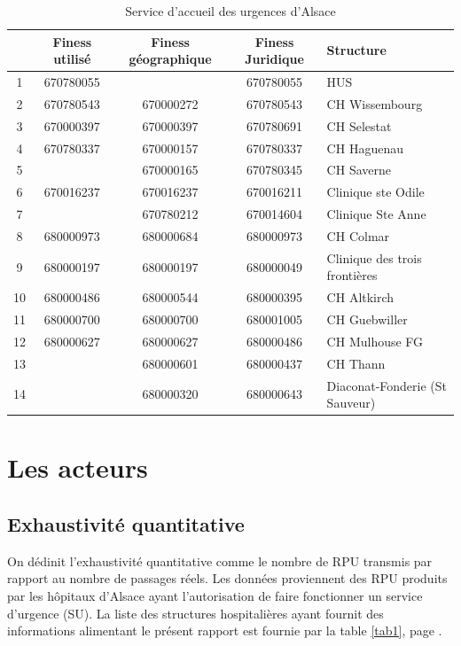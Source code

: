 \documentclass[12pt,english,french,twoside]{report}\usepackage[]{graphicx}\usepackage[]{color}
\begin{document}
\begin{table}
\begin{center}
\begin{tabular}{|c|c|c|c|l|}
  \hline
& Finess utilisé & Finess géographique & Finess Juridique & Structure \\
  \hline
  \hline
1 & 670780055 &   & 670780055 & HUS \\
2 & 670780543 & 670000272 & 670780543 & CH Wissembourg \\
3 & 670000397 & 670000397  & 670780691 & CH Selestat \\
4 & 670780337 & 670000157 & 670780337 & CH Haguenau \\
5 &   & 670000165 & 670780345 & CH Saverne \\
6 & 670016237  & 670016237  & 670016211 & Clinique ste Odile \\
7 &   & 670780212 & 670014604 & Clinique Ste Anne \\
8 & 680000973 & 680000684 & 680000973 & CH Colmar \\
9 & 680000197  & 680000197  & 680000049 & Clinique des trois frontières \\
10 & 680000486 & 680000544  & 680000395 & CH Altkirch \\
11 & 680000700 & 680000700 & 680001005 & CH Guebwiller \\
12 & 680000627 & 680000627 & 680000486 & CH Mulhouse FG \\
13 &   & 680000601 & 680000437 & CH Thann \\
14 &   & 680000320  & 680000643 & Diaconat-Fonderie (St Sauveur) \\
\hline
\end{tabular}
\caption{Service d'accueil des urgences d'Alsace}
\label{summary}
\end{center}
\end{table}


\newpage
\chapter{Les acteurs}



\section{Exhaustivité quantitative}



On dédinit l'exhaustivité quantitative comme le nombre de RPU transmis par rapport au nombre de passages réels.
Les données proviennent des RPU produits par les hôpitaux d'Alsace ayant l'autorisation de faire fonctionner un service d'urgence (SU). La liste des structures hospitalières ayant fournit des informations alimentant le présent rapport est fournie par la table \ref{tab1}, page \pageref{tab1}.
\end{document}
